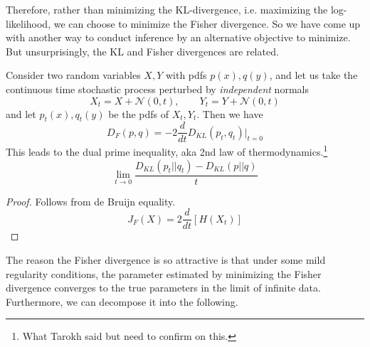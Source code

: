     Therefore, rather than minimizing the KL-divergence, i.e. maximizing the log-likelihood, we can choose to minimize the Fisher divergence. So we have come up with another way to conduct inference by an alternative objective to minimize. But unsurprisingly, the KL and Fisher divergences are related.  

    \begin{theorem}
      Consider two random variables $X, Y$ with pdfs $p(x), q(y)$, and let us take the continuous time stochastic process perturbed by \textit{independent} normals 
      \begin{equation}
        X_t = X + \mathcal{N}(0, t), \qquad Y_t = Y + \mathcal{N}(0, t)
      \end{equation}
      and let $p_t (x), q_t (y)$ be the pdfs of $X_t, Y_t$. Then we have 
      \begin{equation}
        D_F (p, q) = -2 \frac{d}{dt} D_{KL} (p_t, q_t) \bigg|_{t = 0}
      \end{equation}
      This leads to the dual prime inequality, aka 2nd law of thermodynamics.\footnote{What Tarokh said but need to confirm on this.}
      \begin{equation}
        \lim_{t \rightarrow 0} \frac{D_{KL}(p_t || q_t) - D_{KL}(p||q)}{t}
      \end{equation}
    \end{theorem}
    \begin{proof}
      Follows from de Bruijn equality. 
      \begin{equation}
        J_F (X) = 2 \frac{d}{dt} [H(X_t)]
      \end{equation}
    \end{proof}

    The reason the Fisher divergence is so attractive is that under some mild regularity conditions, the parameter estimated by minimizing the Fisher divergence converges to the true parameters in the limit of infinite data. Furthermore, we can decompose it into the following. 

